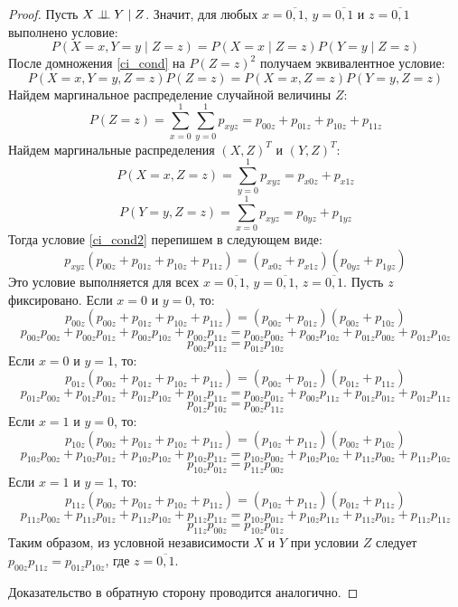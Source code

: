 \begin{proof}
    Пусть $X \perp\!\!\!\perp Y \mid Z$. Значит, для любых $x=\overline{0,1}$, $y=\overline{0,1}$ и $z=\overline{0,1}$ выполнено условие:
    \begin{equation}\label{ci_cond}
        P(X=x, Y=y \mid Z = z) = P(X=x \mid Z = z) P(Y=y \mid Z = z)
    \end{equation}
    После домножения \eqref{ci_cond} на $P(Z=z)^2$ получаем эквивалентное условие:
    \begin{equation}\label{ci_cond2}
        P(X=x,Y=y,Z=z)P(Z=z)=P(X=x,Z=z)P(Y=y,Z=z)
    \end{equation}
    Найдем маргинальное распределение случайной величины $Z$:
    $$
        P(Z=z)=\sum_{x=0}^{1} \sum_{y=0}^{1} p_{xyz} = p_{00z} + p_{01z} + p_{10z} + p_{11z}
    $$
    Найдем маргинальные распределения $(X,Z)^T$ и $(Y,Z)^T$:
    $$
        P(X=x, Z=z) = \sum_{y=0}^{1} p_{xyz} = p_{x0z} + p_{x1z}
    $$
    $$
        P(Y=y, Z=z) = \sum_{x=0}^{1} p_{xyz} = p_{0yz} + p_{1yz}
    $$
    Тогда условие \eqref{ci_cond2} перепишем в следующем виде:
    $$
        p_{xyz} (p_{00z} + p_{01z} + p_{10z} + p_{11z}) = (p_{x0z} + p_{x1z}) (p_{0yz} + p_{1yz})
    $$
    Это условие выполняется для всех $x=\overline{0,1}$, $y=\overline{0,1}$, $z=\overline{0,1}$.
    Пусть $z$ фиксировано.
    Если $x=0$ и $y=0$, то:
    $$
        p_{00z} (p_{00z} + p_{01z} + p_{10z} + p_{11z}) = (p_{00z} + p_{01z}) (p_{00z} + p_{10z})
    $$
    $$
        p_{00z} p_{00z} + p_{00z} p_{01z} + p_{00z} p_{10z} + p_{00z} p_{11z} =
        p_{00z} p_{00z} + p_{00z} p_{10z} + p_{01z} p_{00z} + p_{01z} p_{10z}
    $$
    $$
        p_{00z} p_{11z} = p_{01z} p_{10z}
    $$
    Если $x=0$ и $y=1$, то:
    $$
        p_{01z} (p_{00z} + p_{01z} + p_{10z} + p_{11z}) = (p_{00z} + p_{01z}) (p_{01z} + p_{11z})
    $$
    $$
        p_{01z}p_{00z} + p_{01z}p_{01z} + p_{01z}p_{10z} + p_{01z}p_{11z} =
        p_{00z}p_{01z} + p_{00z} p_{11z} + p_{01z} p_{01z} + p_{01z} p_{11z}
    $$
    $$
        p_{01z}p_{10z}=p_{00z} p_{11z}
    $$
    Если $x=1$ и $y=0$, то:
    $$
        p_{10z} (p_{00z} + p_{01z} + p_{10z} + p_{11z}) = (p_{10z} + p_{11z}) (p_{00z} + p_{10z})
    $$
    $$
        p_{10z} p_{00z} + p_{10z} p_{01z} + p_{10z} p_{10z} + p_{10z} p_{11z} = p_{10z}p_{00z} + p_{10z}p_{10z} + p_{11z}p_{00z} + p_{11z}p_{10z}
    $$
    $$
        p_{10z} p_{01z} = p_{11z}p_{00z}
    $$
    Если $x=1$ и $y=1$, то:
    $$
        p_{11z} (p_{00z} + p_{01z} + p_{10z} + p_{11z}) = (p_{10z} + p_{11z}) (p_{01z} + p_{11z})
    $$
    $$
        p_{11z} p_{00z} + p_{11z} p_{01z} + p_{11z} p_{10z} + p_{11z} p_{11z} = p_{10z} p_{01z} + p_{10z}p_{11z} + p_{11z}p_{01z} +
        p_{11z} p_{11z}
    $$
    $$
        p_{11z} p_{00z} = p_{10z} p_{01z}
    $$
    Таким образом, из условной независимости $X$ и $Y$ при условии $Z$ следует
    $p_{00z}p_{11z}=p_{01z}p_{10z}$, где $z=\overline{0,1}$.

    Доказательство в обратную сторону проводится аналогично.
\end{proof}
